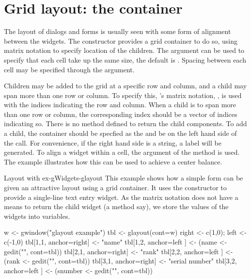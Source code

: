 \section{Grid layout: the  container}
\label{sec:gWidgets-glayout-container}

The layout of dialogs and forms is usually seen with some form of
alignment between the widgets. The  constructor
provides a grid container to do so, using matrix notation to specify location of the children.
The argument
 can be used to specify that each cell
take up the same size, the default is . Spacing between each cell may be specified through the  argument.

Children may be added to the grid at a specific row and column, and a
child may span more than one row or column. To specify this, \R's
matrix notation, \code{[\ASSIGN}, is used with the indices indicating
the row and column.  When a child is to span more than one row or
column, the corresponding index should be a vector of indices
indicating so.  There is no \code{[} method defined to return the
child components.  
To add a child, the  container should be specfied as the  and be on the left hand side of the \code{[\ASSIGN} call. For convenience, if the right hand side is a string, a label will be generated.
To align a widget within a cell, the
 argument of the \code{[\ASSIGN}{glayout} method
is used. The example illustrates how this can be used to achieve a center balance.


\begin{example}{Layout with }{ex-gWidgets-glayout}
  This example shows how a simple form can be given an attractive
  layout using a grid container. It uses the 
  constructor to provide a single-line text entry widget. As the
  matrix notation does not have a means to return the child widget (a
  \code{[} method say), we store the values of the
   widgets into variables.
\begin{Schunk}
\begin{Sinput}
 w <- gwindow("glayout example")
 tbl <- glayout(cont=w)
 right <- c(1,0); left <- c(-1,0)
 tbl[1,1, anchor=right] <- "name"
 tbl[1,2, anchor=left ] <- (name <- gedit("", cont=tbl))
 tbl[2,1, anchor=right] <- "rank"
 tbl[2,2, anchor=left ] <- (rank <- gedit("", cont=tbl))
 tbl[3,1, anchor=right] <- "serial number"
 tbl[3,2, anchor=left ] <- (snumber <- gedit("", cont=tbl))
\end{Sinput}
\end{Schunk}
\end{example}







